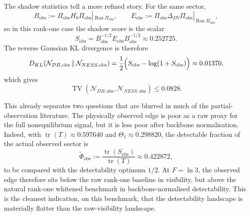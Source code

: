 \documentclass[11pt,a4paper]{article}
\numberwithin{equation}{section}
\theoremstyle{thmcompact}
\theoremstyle{remark}
\begin{document}
The shadow statistics tell a more refined story. For the same sector,
\begin{equation}
B_{\mathrm{obs}}:=\Pi_{\mathrm{obs}}H_0\Pi_{\mathrm{obs}}|_{\operatorname{Ran}\Pi_{\mathrm{obs}}},
\qquad
E_{\mathrm{obs}}:=\Pi_{\mathrm{obs}}\Delta_{DV}\Pi_{\mathrm{obs}}|_{\operatorname{Ran}\Pi_{\mathrm{obs}}},
\end{equation}
so in this rank-one case the shadow score is the scalar
\begin{equation}
S_{\mathrm{obs}}
=
B_{\mathrm{obs}}^{-1/2}E_{\mathrm{obs}}B_{\mathrm{obs}}^{-1/2}
\approx 0.252725.
\end{equation}
The reverse Gaussian KL divergence is therefore
\begin{equation}
D_{KL}\!\left(\mathcal N_{DB,\mathrm{obs}}\,\|\,\mathcal N_{NESS,\mathrm{obs}}\right)
=
\frac12\Bigl(S_{\mathrm{obs}}-\log(1+S_{\mathrm{obs}})\Bigr)
\approx 0.01370,
\end{equation}
which gives
\begin{equation}
\operatorname{TV}\!\left(\mathcal N_{DB,\mathrm{obs}},\mathcal N_{NESS,\mathrm{obs}}\right)
\le 0.0828.
\end{equation}

This already separates two questions that are blurred in much of the partial-observation literature. The physically observed edge is poor as a raw proxy for the full nonequilibrium signal, but it is less poor after backbone normalisation. Indeed, with \(\operatorname{tr}(T)\approx 0.597640\) and \(\Theta_1\approx 0.298820\), the detectable fraction of the actual observed sector is
\begin{equation}
\widetilde\Phi_{\mathrm{obs}}
:=
\frac{\operatorname{tr}(S_{\mathrm{obs}})}{\operatorname{tr}(T)}
\approx 0.422872,
\end{equation}
to be compared with the detectability optimum \(1/2\). At \(F=\ln 3\), the observed edge therefore sits below the raw rank-one baseline in visibility, but above the natural rank-one whitened benchmark in backbone-normalised detectability. This is the cleanest indication, on this benchmark, that the detectability landscape is materially flatter than the raw-visibility landscape.
\end{document}
